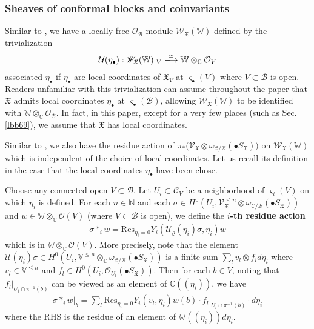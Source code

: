 \documentclass[11pt,b5paper,notitlepage]{article}
\theoremstyle{definition}
\theoremstyle{plain}
\newcommand{\fk}{\mathfrak}
\newcommand{\mc}{\mathcal}
\newcommand{\Res}{\mathrm{Res}}
\newcommand{\SV}{\mathscr{V}}
\newcommand{\scr}{\mathscr}
\newcommand{\sgm}{\varsigma}
\newcommand{\SX}{{S_{\fk X}}}
\newcommand{\blt}{\bullet}
\newcommand{\Vbb}{\mathbb V}
\newcommand{\Wbb}{\mathbb W}
\newcommand{\Cbb}{\mathbb C}
\newcommand{\Nbb}{\mathbb N}
\newcommand{\<}{\left\langle}
\renewcommand{\>}{\right\rangle}
\newcommand{\MO}{\mathcal{O}}
\newcommand{\MU}{\mathcal{U}}
\newcommand{\MC}{\mathcal{C}}
\newcommand{\MB}{\mathcal{B}}
\newcommand{\fx}{\mathfrak{X}}
\newcommand{\SW}{\mathscr{W}}
\numberwithin{equation}{subsection}
\begin{document}
\subsubsection{Sheaves of conformal blocks and coinvariants}\label{lbb10}



Similar to  \cite[Def. 2.2.4]{GZ1}, we have a locally free $\MO_\MB$-module $\SW_\fx(\Wbb)$ defined by the trivialization
\begin{align*}
\mathcal U(\eta_\blt):\scr W_\fx(\Wbb)|_V\xlongrightarrow{\simeq}\Wbb\otimes_\Cbb\mc O_V
\end{align*}
associated $\eta_\blt$ if $\eta_\blt$ are local coordinates of $\fx_V$ at $\sgm_\blt(V)$ where $V\subset\MB$ is open. Readers unfamiliar with this trivialization can assume throughout the paper that $\fx$ admits local coordinates $\eta_\blt$ at $\sgm_\blt(\MB)$, allowing $\scr W_\fx(\Wbb)$ to be identified with $\Wbb\otimes_\Cbb\mc O_\MB$. In fact, in this paper, except for a very few places (such as Sec. \ref{lbb69}), we assume that $\fx$ has local coordinates.

Similar to \cite[Def. 2.2.8]{GZ1}, we also have the residue action of $\pi_*\big(\SV_{\fx}\otimes \omega_{\MC/\MB}(\blt S_\fx)\big)$ on $\SW_\fx(\Wbb)$ which is independent of the choice of local coordinates. Let us recall its definition in the case that the local coordinates $\eta_\blt$ have been chose. 


Choose any connected open $V\subset\MB$. Let $U_i\subset\MC_V$ be a neighborhood of $\sgm_i(V)$ on which $\eta_i$ is defined. For each $n\in\Nbb$ and each $\sigma\in H^0(U_i,\scr V_\fx^{\leq n}\otimes\omega_{\MC/\MB}(\blt\SX))$ and $w\in\Wbb\otimes_\Cbb\MO(V)$ (where $V\subset\MB$ is open), we define the \textbf{$i$-th residue action}
\begin{align}
\sigma*_i w=\Res_{\eta_i=0}Y_i(\MU_\varrho(\eta_i)\sigma,\eta_i)w
\end{align}
which is in $\Wbb\otimes_\Cbb\MO(V)$. More precisely, note that
the element $\mc U(\eta_i)\sigma\in H^0(U_i,\Vbb^{\leq n}\otimes_\Cbb\omega_{\MC/\MB}(\blt\SX))$ is a finite sum $\sum_l v_l\otimes f_ld\eta_i$ where $v_l\in\Vbb^{\leq n}$ and $f_l\in H^0(U_i,\MO_{U_i}(\blt\SX))$. Then for each $b\in V$, noting that $f_l|_{U_i\cap\pi^{-1}(b)}$ can be viewed as an element of $\Cbb((\eta_i))$, we have
\begin{align*}
\sigma*_iw\big|_b=\sum_l\Res_{\eta_i=0} Y_i(v_l,\eta_i)w(b)\cdot f_l|_{U_i\cap\pi^{-1}(b)}\cdot d\eta_i
\end{align*}
where the RHS is the residue of an element of $\Wbb((\eta_i))d\eta_i$.
\end{document}
